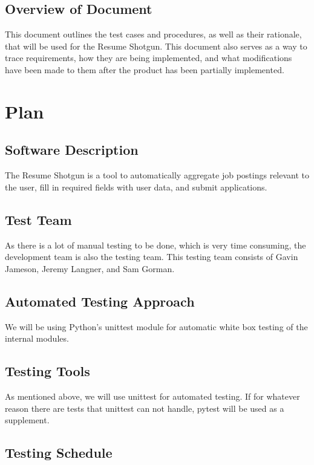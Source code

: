 \documentclass[12pt, titlepage]{article}
\begin{document}
\subsection{Overview of Document}

This document outlines the test cases and procedures, as well as their rationale, that will be used for the Resume Shotgun. This document also serves as a way to trace requirements, how they are being implemented, and what modifications have been made to them after the product has been partially implemented.

\section{Plan}
	
\subsection{Software Description}

The Resume Shotgun is a tool to automatically aggregate job postings relevant to the user, fill in required fields with user data, and submit applications. 

\subsection{Test Team}

As there is a lot of manual testing to be done, which is very time consuming, the development team is also the testing team. This testing team consists of Gavin Jameson, Jeremy Langner, and Sam Gorman.

\subsection{Automated Testing Approach}

We will be using Python's unittest module for automatic white box testing of the internal modules. 

\subsection{Testing Tools}

As mentioned above, we will use unittest for automated testing. If for whatever reason there are tests that unittest can not handle, pytest will be used as a supplement. 

\subsection{Testing Schedule}
		
\end{document}
